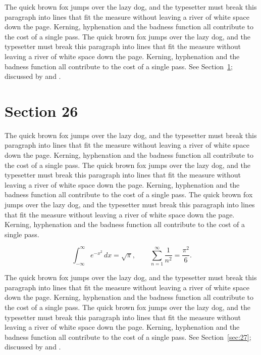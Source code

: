 \documentclass{article}
\begin{document}
The quick brown fox jumps over the lazy dog, and the typesetter must break this paragraph into lines that fit the measure without leaving a river of white space down the page. Kerning, hyphenation and the badness function all contribute to the cost of a single pass. The quick brown fox jumps over the lazy dog, and the typesetter must break this paragraph into lines that fit the measure without leaving a river of white space down the page. Kerning, hyphenation and the badness function all contribute to the cost of a single pass. 
See Section~\ref{sec:26}; discussed by \textcite{k1} and \textcite{l3}.
\section{Section 26}
\label{sec:26}
The quick brown fox jumps over the lazy dog, and the typesetter must break this paragraph into lines that fit the measure without leaving a river of white space down the page. Kerning, hyphenation and the badness function all contribute to the cost of a single pass. The quick brown fox jumps over the lazy dog, and the typesetter must break this paragraph into lines that fit the measure without leaving a river of white space down the page. Kerning, hyphenation and the badness function all contribute to the cost of a single pass. The quick brown fox jumps over the lazy dog, and the typesetter must break this paragraph into lines that fit the measure without leaving a river of white space down the page. Kerning, hyphenation and the badness function all contribute to the cost of a single pass. 

\begin{equation}\label{eq:26}
\int_{-\infty}^{\infty} e^{-x^{2}}\,dx = \sqrt{\pi}, \qquad
\sum_{n=1}^{\infty} \frac{1}{n^{2}} = \frac{\pi^{2}}{6}.
\end{equation}

The quick brown fox jumps over the lazy dog, and the typesetter must break this paragraph into lines that fit the measure without leaving a river of white space down the page. Kerning, hyphenation and the badness function all contribute to the cost of a single pass. The quick brown fox jumps over the lazy dog, and the typesetter must break this paragraph into lines that fit the measure without leaving a river of white space down the page. Kerning, hyphenation and the badness function all contribute to the cost of a single pass. 
See Section~\ref{sec:27}; discussed by \textcite{k2} and \textcite{l4}.
\end{document}
